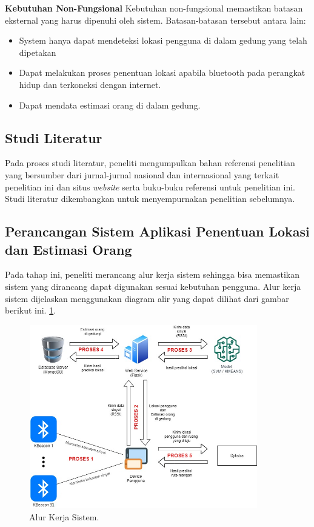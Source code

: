 \par \textbf{Kebutuhan Non-Fungsional} Kebutuhan non-fungsional memastikan batasan eksternal yang harus dipenuhi oleh sistem. Batasan-batasan tersebut antara lain:
\begin{itemize}
	\item System hanya dapat mendeteksi lokasi pengguna di dalam gedung yang telah dipetakan

	\item Dapat melakukan proses penentuan lokasi apabila bluetooth pada perangkat hidup dan terkoneksi dengan internet.

	\item Dapat mendata estimasi orang di dalam gedung.

\end{itemize}



\subsection{Studi Literatur}
Pada proses studi literatur, peneliti mengumpulkan bahan referensi penelitian yang bersumber dari jurnal-jurnal nasional dan internasional yang terkait penelitian ini dan situs \textit{website} serta buku-buku referensi untuk penelitian ini. Studi literatur dikembangkan untuk menyempurnakan penelitian sebelumnya.

\subsection{Perancangan Sistem Aplikasi Penentuan Lokasi dan Estimasi Orang}
Pada tahap ini, peneliti merancang alur kerja  sistem sehingga bisa memastikan sistem yang dirancang dapat digunakan sesuai kebutuhan pengguna. Alur kerja sistem dijelaskan menggunakan diagram alir yang dapat dilihat dari gambar berikut ini.
\ref{alur-kerja-sistem}.

\begin{figure}[H]
	\centering
	\includegraphics[width=10cm, height=8cm]{gambar/alurkerja.jpeg}
	\caption{Alur Kerja Sistem.}
	\label{alur-kerja-sistem}
\end{figure}

